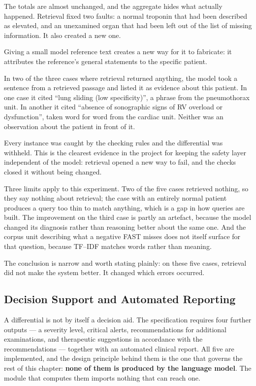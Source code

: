 The totals are almost unchanged, and the aggregate hides what actually happened. Retrieval
fixed two faults: a normal troponin that had been described as elevated, and an unexamined
organ that had been left out of the list of missing information. It also created a new
one.

\begin{keystatement}
Giving a small model reference text creates a new way for it to fabricate: it attributes
the reference's general statements to the specific patient.
\end{keystatement}

In two of the three cases where retrieval returned anything, the model took a sentence from
a retrieved passage and listed it as evidence about this patient. In one case it cited
``lung sliding (low specificity)'', a phrase from the pneumothorax unit. In another it
cited ``absence of sonographic signs of RV overload or dysfunction'', taken word for word
from the cardiac unit. Neither was an observation about the patient in front of it.

Every instance was caught by the checking rules and the differential was withheld. This is
the clearest evidence in the project for keeping the safety layer independent of the model:
retrieval opened a new way to fail, and the checks closed it without being changed.

Three limits apply to this experiment. Two of the five cases retrieved nothing, so they say
nothing about retrieval; the case with an entirely normal patient produces a query too thin
to match anything, which is a gap in how queries are built. The improvement on the third
case is partly an artefact, because the model changed its diagnosis rather than reasoning
better about the same one. And the corpus unit describing what a negative FAST misses does
not itself surface for that question, because TF--IDF matches words rather than meaning.

The conclusion is narrow and worth stating plainly: on these five cases, retrieval did not
make the system better. It changed which errors occurred.

\subsection{Decision Support and Automated Reporting}
\label{subsec:reasoning-decision-support}

A differential is not by itself a decision aid. The specification requires four further
outputs --- a severity level, critical alerts, recommendations for additional examinations,
and therapeutic suggestions in accordance with the recommendations --- together with an
automated clinical report. All five are implemented, and the design principle behind them is
the one that governs the rest of this chapter: \textbf{none of them is produced by the
language model}. The module that computes them imports nothing that can reach one.

